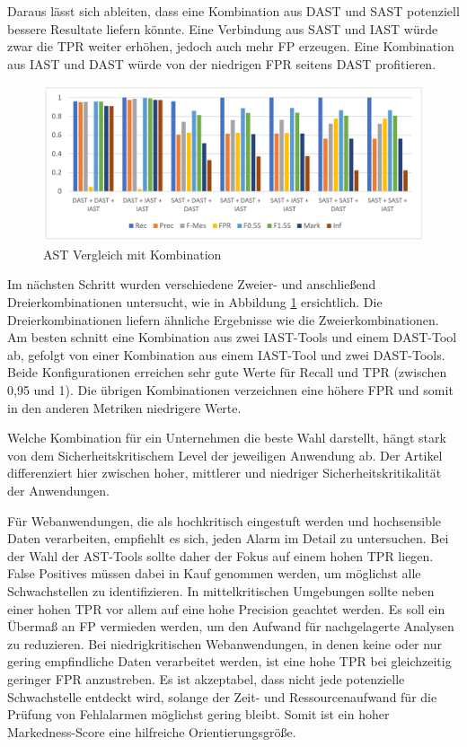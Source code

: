 \documentclass[acmtog]{acmart}
\begin{document}
Daraus lässt sich ableiten, dass eine Kombination aus DAST und SAST potenziell bessere Resultate liefern könnte.
Eine Verbindung aus SAST und IAST würde zwar die TPR weiter erhöhen, jedoch auch mehr FP erzeugen.
Eine Kombination aus IAST und DAST würde von der niedrigen FPR seitens DAST profitieren.
\cite{mateo_tudela_combining_2020}

\begin{figure}[H]
	\centering
	\includegraphics[width=0.9\linewidth]{images/AST_Comparison_Combination.png}
	\caption{AST Vergleich mit Kombination \cite{mateo_tudela_combining_2020}}
	\label{fig:astCompareCompination}
\end{figure}

Im nächsten Schritt wurden verschiedene Zweier- und anschließend Dreierkombinationen untersucht, wie in Abbildung \ref{fig:astCompareCompination} ersichtlich.
Die Dreierkombinationen liefern ähnliche Ergebnisse wie die Zweierkombinationen.
Am besten schnitt eine Kombination aus zwei IAST-Tools und einem DAST-Tool ab, gefolgt von einer Kombination aus einem IAST-Tool und zwei DAST-Tools.
Beide Konfigurationen erreichen sehr gute Werte für Recall und TPR (zwischen 0,95 und 1). 
Die übrigen Kombinationen verzeichnen eine höhere FPR und somit in den anderen Metriken niedrigere Werte.
\cite{mateo_tudela_combining_2020}

Welche Kombination für ein Unternehmen die beste Wahl darstellt, hängt stark von dem Sicherheitskritischem Level der jeweiligen Anwendung ab.
Der Artikel differenziert hier zwischen hoher, mittlerer und niedriger Sicherheitskritikalität der Anwendungen.
\cite{mateo_tudela_combining_2020}

Für Webanwendungen, die als hochkritisch eingestuft werden und hochsensible Daten verarbeiten, empfiehlt es sich, jeden Alarm im Detail zu untersuchen. Bei der Wahl der AST-Tools sollte daher der Fokus auf einem hohen TPR liegen. 
False Positives müssen dabei in Kauf genommen werden, um möglichst alle Schwachstellen zu identifizieren.
In mittelkritischen Umgebungen sollte neben einer hohen TPR vor allem auf eine hohe Precision geachtet werden.
Es soll ein Übermaß an FP vermieden werden, um den Aufwand für nachgelagerte Analysen zu reduzieren.
Bei niedrigkritischen Webanwendungen, in denen keine oder nur gering empfindliche Daten verarbeitet werden, ist eine hohe TPR bei gleichzeitig geringer FPR anzustreben. 
Es ist akzeptabel, dass nicht jede potenzielle Schwachstelle entdeckt wird, solange der Zeit- und Ressourcenaufwand für die Prüfung von Fehlalarmen möglichst gering bleibt.
Somit ist ein hoher Markedness-Score eine hilfreiche Orientierungsgröße.
\cite{mateo_tudela_combining_2020}
\end{document}
